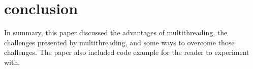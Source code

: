 \documentclass[titlepage]{article}
\begin{document}
\section{conclusion}

In summary, this paper discussed the advantages of multithreading, the challenges presented by multithreading, and some ways to overcome those challenges. The paper also included code example for the reader to experiment with.


\begin{singlespace}


\newpage
\nocite{*}
\printbibliography
\end{singlespace}
\end{document}
